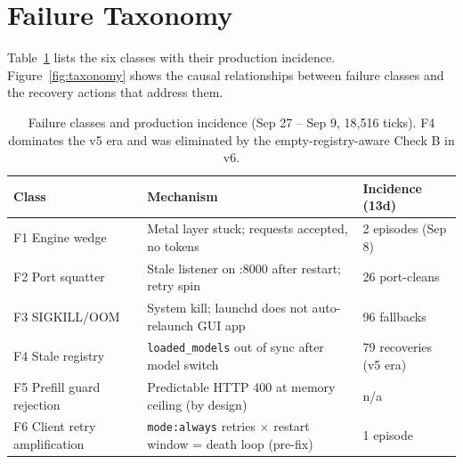 \documentclass[10pt]{article}
\begin{document}
\section{Failure Taxonomy}\label{sec:taxonomy}

Table~\ref{tab:fails} lists the six classes with their production incidence. Figure~\ref{fig:taxonomy} shows the causal relationships between failure classes and the recovery actions that address them.

\begin{table}[t]\centering
\small
\renewcommand{\arraystretch}{1.3}
\begin{tabular}{@{}lll@{}}
\toprule
Class & Mechanism & Incidence (13d) \\
\midrule
F1 Engine wedge   & Metal layer stuck; requests accepted, no tokens & 2 episodes (Sep 8) \\
F2 Port squatter  & Stale listener on :8000 after restart; retry spin & 26 port-cleans \\
F3 SIGKILL/OOM    & System kill; launchd does not auto-relaunch GUI app & 96 fallbacks \\
F4 Stale registry & \texttt{loaded\_models} out of sync after model switch & 79 recoveries (v5 era) \\
F5 Prefill guard rejection & Predictable HTTP 400 at memory ceiling (by design) & n/a \\
F6 Client retry amplification & \texttt{mode:always} retries $\times$ restart window = death loop (pre-fix) & 1 episode \\
\bottomrule
\end{tabular}
\caption{Failure classes and production incidence (Sep 27 -- Sep 9, 18{,}516 ticks). F4 dominates the v5 era and was eliminated by the empty-registry-aware Check B in v6.}
\label{tab:fails}
\end{table}
\end{document}
